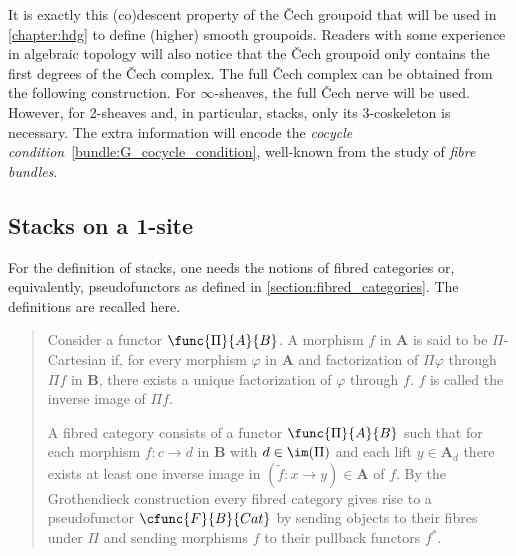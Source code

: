         It is exactly this (co)descent property of the \v{C}ech groupoid that will be used in \cref{chapter:hdg} to define (higher) smooth groupoids. Readers with some experience in algebraic topology will also notice that the \v{C}ech groupoid only contains the first degrees of the \v{C}ech complex. The full \v{C}ech complex can be obtained from the following construction.
        For $\infty$-sheaves, the full \v{C}ech nerve will be used. However, for 2-sheaves and, in particular, stacks, only its 3-coskeleton is necessary. The extra information will encode the \textit{cocycle condition}~\eqref{bundle:G_cocycle_condition}, well-known from the study of \textit{fibre bundles}.
    
    \subsection{Stacks on a 1-site}
    
        For the definition of stacks, one needs the notions of fibred categories or, equivalently, pseudofunctors as defined in \cref{section:fibred_categories}. The definitions are recalled here.
        \begin{quote}
            Consider a functor $\func{\Pi}{A}{B}$. A morphism $f$ in $\mathbf{A}$ is said to be $\Pi$-Cartesian if, for every morphism $\varphi$ in $\mathbf{A}$ and factorization of $\Pi\varphi$ through $\Pi f$ in $\mathbf{B}$, there exists a unique factorization of $\varphi$ through $f$. $f$ is called the inverse image of $\Pi f$.
    
            A fibred category consists of a functor $\func{\Pi}{A}{B}$ such that for each morphism $f:c\rightarrow d$ in $\mathbf{B}$ with $d\in\im(\Pi)$ and each lift $y\in\mathbf{A}_d$ there exists at least one inverse image in $(\widetilde{f}:x\rightarrow y)\in\mathbf{A}$ of $f$. By the Grothendieck construction every fibred category gives rise to a pseudofunctor $\cfunc{F}{B}{Cat}$ by sending objects to their fibres under $\Pi$ and sending morphisms $f$ to their pullback functors $f^*$.
        \end{quote}
    
